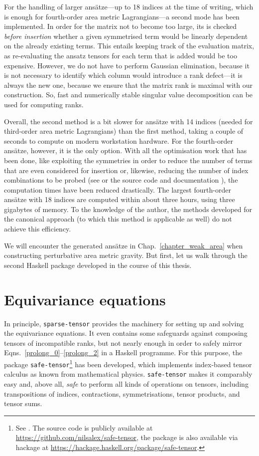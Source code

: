 For the handling of larger ansätze---up to 18 indices at the time of writing, which is enough for fourth-order area metric Lagrangians---a second mode has been implemented. In order for the matrix not to become too large, its is checked \emph{before insertion} whether a given symmetrised term would be linearly dependent on the already existing terms. This entails keeping track of the evaluation matrix, as re-evaluating the ansatz tensors for each term that is added would be too expensive. However, we do not have to perform Gaussian elimination, because it is not necessary to identify which column would introduce a rank defect---it is always the new one, because we ensure that the matrix rank is maximal with our construction. So, fast and numerically stable singular value decomposition can be used for computing ranks.

Overall, the second method is a bit slower for ansätze with 14 indices (needed for third-order area metric Lagrangians) than the first method, taking a couple of seconds to compute on modern workstation hardware. For the fourth-order ansätze, however, it is the only option. With all the optimisation work that has been done, like exploiting the symmetries in order to reduce the number of terms that are even considered for insertion or, likewise, reducing the number of index combinations to be probed (see \cite{Reinhart_2019} or the source code and documentation \cite{Reinhart_2019_sparse-tensor}), the computation times have been reduced drastically. The largest fourth-order ansätze with 18 indices are computed within about three hours, using three gigabytes of memory. To the knowledge of the author, the methods developed for the canonical approach \cite{Schneider_2017} (to which this method is applicable as well) do not achieve this efficiency.

We will encounter the generated ansätze in Chap.~\ref{chapter_weak_area} when constructing perturbative area metric gravity. But first, let us walk through the second Haskell package developed in the course of this thesis.

\section{Equivariance equations}\label{sect_safe-tensor}
In principle, \texttt{sparse-tensor} provides the machinery for setting up and solving the equivariance equations. It even contains some safeguards against composing tensors of incompatible ranks, but not nearly enough in order to safely mirror Eqns.\ \eqref{prolong_0}--\eqref{prolong_2} in a Haskell programme. For this purpose, the package \texttt{safe-tensor}\footnote{See \cite{Alex_2020_safe-tensor}. The source code is publicly available at \url{https://github.com/nilsalex/safe-tensor}, the package is also available via hackage at \url{https://hackage.haskell.org/package/safe-tensor}.} has been developed, which implements index-based tensor calculus as known from mathematical physics. \texttt{safe-tensor} makes it comparably easy and, above all, \emph{safe} to perform all kinds of operations on tensors, including transpositions of indices, contractions, symmetrisations, tensor products, and tensor sums.

